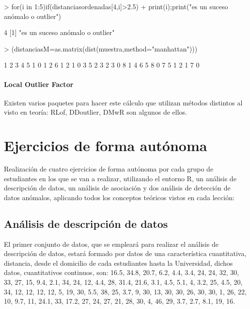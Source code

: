 \documentclass[a4paper, 12pt]{article}
\begin{document}
\begin{Schunk}
\begin{Sinput}
> for(i in 1:5){if(distanciasordenadas[4,i]>2.5)
+ {print(i);print("es un suceso anómalo o outlier")}}
\end{Sinput}
\begin{Soutput}
[1] 4
[1] "es un suceso anómalo o outlier"
\end{Soutput}
\begin{Sinput}
> (distanciasM=as.matrix(dist(muestra,method="manhattan")))
\end{Sinput}
\begin{Soutput}
  1 2 3 4 5
1 0 1 2 6 1
2 1 0 3 5 2
3 2 3 0 8 1
4 6 5 8 0 7
5 1 2 1 7 0
\end{Soutput}
\end{Schunk}
	
	\paragraph{Local Outlier Factor}
	Existen varios paquetes para hacer este cálculo que utilizan métodos distintos al visto en teoría: RLof, DDoutlier, DMwR son algunos de ellos.
	
	\section{Ejercicios de forma autónoma}
	Realización de cuatro ejercicios de forma autónoma por cada grupo de estudiantes en los que se van a realizar, utilizando el entorno R, un análisis de descripción de datos, un análisis de asociación y dos análisis de detección de datos anómalos, aplicando todos los conceptos teóricos vistos en cada lección:
	
	\subsection{Análisis de descripción de datos}
	El primer conjunto de datos, que se empleará para realizar el análisis de descripción de datos, estará formado por datos de una característica cuantitativa, distancia, desde el domicilio de cada estudiantes hasta la Universidad, dichos datos, cuantitativos continuos, son: 16.5, 34.8, 20.7, 6.2, 4.4, 3.4, 24, 24, 32, 30, 33, 27, 15, 9.4, 2.1, 34, 24, 12, 4.4, 28, 31.4, 21.6, 3.1, 4.5, 5.1, 4, 3.2, 25, 4.5, 20, 34, 12, 12, 12, 12, 5, 19, 30, 5.5, 38, 25, 3.7, 9, 30, 13, 30, 30, 26, 30, 30, 1, 26, 22, 10, 9.7, 11, 24.1, 33, 17.2, 27, 24, 27, 21, 28, 30, 4, 46, 29, 3.7, 2.7, 8.1, 19, 16.
\end{document}

